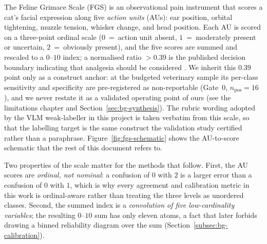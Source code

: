 The Feline Grimace Scale (FGS) is an observational pain instrument that scores a
cat's facial expression along five \emph{action units} (AUs): ear position,
orbital tightening, muzzle tension, whisker change, and head position. Each AU
is scored on a three-point ordinal scale ($0$~=~action unit absent,
$1$~=~moderately present or uncertain, $2$~=~obviously present), and the five
scores are summed and rescaled to a $0$--$10$ index; a normalised ratio
$>0.39$ is the published decision boundary indicating that analgesia should
be considered \cite{evangelista2019}. We inherit this $0.39$ point only as a
construct anchor: at the budgeted veterinary sample its per-class sensitivity and
specificity are pre-registered as non-reportable (Gate~0,
$n_{\text{pos}}{=}16$), and we never restate it as a validated operating point of
ours (see the limitations chapter and Section~\ref{sec:bg-synthesis}). The rubric wording adopted by the VLM
weak-labeller in this project is taken verbatim from this scale, so that the
labelling target is the same construct the validation study certified rather
than a paraphrase. Figure~\ref{fig:fgs-schematic} shows the AU-to-score
schematic that the rest of this document refers to.

Two properties of the scale matter for the methods that follow. First, the AU
scores are \emph{ordinal, not nominal}: a confusion of $0$ with $2$ is a larger
error than a confusion of $0$ with $1$, which is why every agreement and
calibration metric in this work is ordinal-aware rather than treating the three
levels as unordered classes. Second, the summed index is a
\emph{convolution of five low-cardinality variables}; the resulting $0$--$10$
sum has only eleven atoms, a fact that later forbids drawing a binned
reliability diagram over the sum (Section~\ref{subsec:bg-calibration}).

